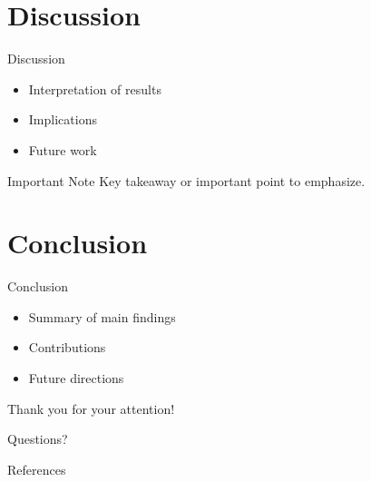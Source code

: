 \documentclass[aspectratio=169]{beamer}
\begin{document}
\section{Discussion}
\begin{frame}{Discussion}
    \begin{itemize}
        \item<1-> Interpretation of results
        \item<2-> Implications
        \item<3-> Future work
    \end{itemize}
    
    \begin{alertblock}{Important Note}
        Key takeaway or important point to emphasize.
    \end{alertblock}
\end{frame}

\section{Conclusion}
\begin{frame}{Conclusion}
    \begin{itemize}
        \item Summary of main findings
        \item Contributions
        \item Future directions
    \end{itemize}
    
    \vspace{1cm}
    \centering
    \Large Thank you for your attention!
    
    \vspace{0.5cm}
    \normalsize Questions?
\end{frame}

\begin{frame}[allowframebreaks]{References}
    
    
\end{frame}
\end{document}
